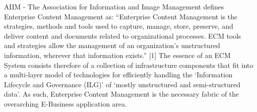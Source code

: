 


\graphicspath{{2/figures/}}

AIIM - The Association for Information and Image Management defines Enterprise Content Management as:  
 “Enterprise Content Management is the strategies, methods and tools used to capture, manage, store, preserve, and deliver content and documents related to organizational processes. ECM tools and strategies allow the management of an organization's unstructured information, wherever that information exists.” [1] 
The essence of an ECM System consists therefore of a collection of infrastructure components that fit into a multi-layer model of technologies for efficiently handling the ‘Information Lifecycle and Governance (ILG)’ of ‘mostly unstructured and semi-structured data’. As such, Enterprise Content Management is the necessary fabric of the overarching E-Business application area. 

